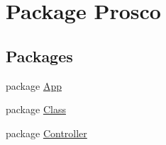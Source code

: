 \hypertarget{namespace_prosco}{\section{Package Prosco}
\label{namespace_prosco}
}
\subsection*{Packages}
\begin{DoxyCompactItemize}
\item 
package \hyperlink{namespace_prosco_1_1_app}{App}
\item 
package \hyperlink{namespace_prosco_1_1_class}{Class}
\item 
package \hyperlink{namespace_prosco_1_1_controller}{Controller}
\end{DoxyCompactItemize}
